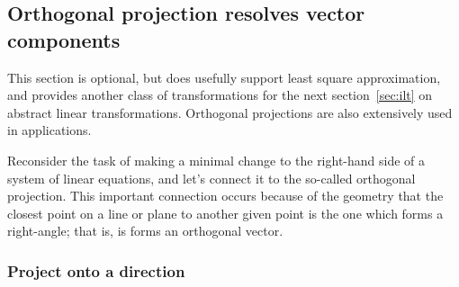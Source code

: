\subsection{Orthogonal projection resolves vector components}
\label{sec:proj}


\begin{comment}
\cite[p.738]{HughesHallett2013} \pooliv{p.27--8}
onto a vector, parallel and perpendicular components, work done
\pooliv{p.382}
orthogonal projections onto subspace, orthogonal decomposition thm,
\end{comment}

\begin{aside}
This section is optional, but does usefully support least square approximation, and provides another class of transformations for the next section~\ref{sec:ilt} on abstract linear transformations.
Orthogonal projections are also extensively used in applications.
\end{aside}
Reconsider the task of making a minimal change to the right-hand side of a system of linear equations, and let's connect it to the so-called orthogonal projection.
This important connection occurs because of the geometry that the closest point on a line or plane to another given point is the one which forms a right-angle; that is, is forms an orthogonal vector.



\subsubsection{Project onto a direction}

